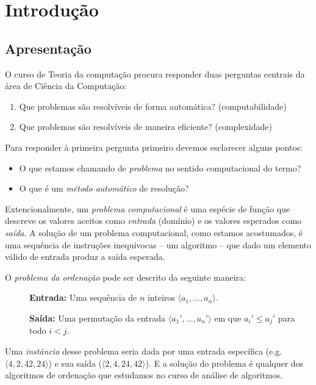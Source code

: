 \chapter{Introdução}
\label{cha:intro}

\section{Apresentação}
\label{sec:apresentacao}

O curso de Teoria da computação procura responder duas perguntas centrais da área de Ciência da Computação:
\begin{enumerate}
\item Que problemas são resolvíveis de forma automática? (computabilidade)
\item Que problemas são resolvíveis de maneira eficiente? (complexidade)
\end{enumerate}

Para responder à primeira pergunta primeiro devemos esclarecer alguns pontos:
\begin{itemize}
\item O que estamos chamando de {\em problema} no sentido computacional do termo?
\item O que é um {\em método automático} de resolução?
\end{itemize}

Extencionalmente, um {\em problema computacional} é uma espécie de função que descreve os valores aceitos como {\em entrada} (domínio) e os valores esperados como {\em saída}.
A solução de um problema computacional, como estamos acostumados, é uma sequência de instruções inequívocas -- um algoritmo -- que dado um elemento válido de entrada produz a saída esperada.

\begin{example}
O {\em problema da ordenação} pode ser descrito da seguinte maneira:

\begin{description}
\item[] {\bf Entrada:} Uma sequência de $n$ inteiros $\langle a_1, \dots, a_n \rangle$.
\item[] {\bf Saída:} Uma permutação da entrada $\langle a_1', \dots, a_n' \rangle$ em que $a_i' \leq a_j'$ para todo $i < j$.
\end{description}

Uma {\em instância} desse problema seria dada por uma entrada específica (e.g. $\langle 4, 2, 42, 24 \rangle$) e sua saída ($\langle 2, 4, 24, 42 \rangle$).
E a solução do problema é qualquer dos algoritmos de ordenação que estudamos no curso de análise de algoritmos.
\end{example}

